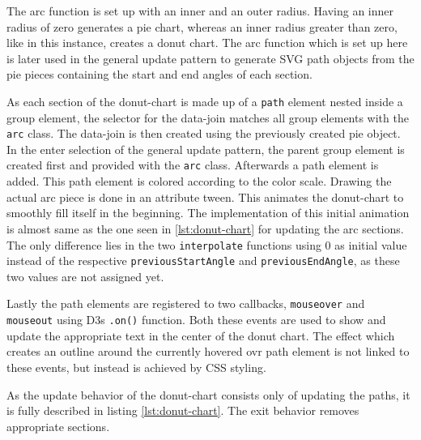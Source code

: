 The arc function is set up with an inner and an outer radius. Having an inner radius of zero generates a pie chart, whereas an inner radius greater than zero, like in this instance, creates a donut chart. The arc function which is set up here is later used in the general update pattern to generate SVG path objects from the pie pieces containing the start and end angles of each section.

As each section of the donut-chart is made up of a \texttt{path} element nested inside a group element, the selector for the data-join matches all group elements with the \texttt{arc} class. The data-join is then created using the previously created pie object. In the enter selection of the general update pattern, the parent group element is created first and provided with the \texttt{arc} class. Afterwards a path element is added. This path element is colored according to the color scale. Drawing the actual arc piece is done in an attribute tween. This animates the donut-chart to smoothly fill itself in the beginning. The implementation of this initial animation is almost same as the one seen in \ref{lst:donut-chart} for updating the arc sections. The only difference lies in the two \texttt{interpolate} functions using 0 as initial value instead of the respective \texttt{previousStartAngle} and \texttt{previousEndAngle}, as these two values are not assigned yet.

Lastly the path elements are registered to two callbacks, \texttt{mouseover} and \texttt{mouseout} using D3s \texttt{.on()} function. Both these events are used to show and update the appropriate text in the center of the donut chart. The effect which creates an outline around the currently hovered ovr path element is not linked to these events, but instead is achieved by CSS styling.

As the update behavior of the donut-chart consists only of updating the paths, it is fully described in listing \ref{lst:donut-chart}. The exit behavior removes appropriate sections.

